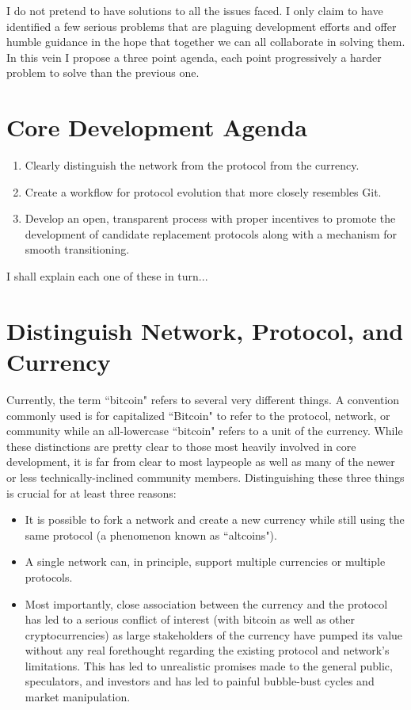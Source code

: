 \documentclass{article}
\begin{document}
I do not pretend to have solutions to all the issues faced. I only claim to have identified a few serious problems that are plaguing development efforts and offer humble guidance in the hope that together we can all collaborate in solving them. In this vein I propose a three point agenda, each point progressively a harder problem to solve than the previous one. 

\pagebreak

\section*{Core Development Agenda}

\begin{enumerate}
	\item Clearly distinguish the network from the protocol from the currency.
	\item Create a workflow for protocol evolution that more closely resembles Git.
	\item Develop an open, transparent process with proper incentives to promote the development of candidate replacement protocols along with a mechanism for smooth transitioning.
\end{enumerate}

I shall explain each one of these in turn...

\pagebreak

\section{Distinguish Network, Protocol, and Currency}

Currently, the term ``bitcoin" refers to several very different things. A convention commonly used is for capitalized ``Bitcoin" to refer to the protocol, network, or community while an all-lowercase ``bitcoin" refers to a unit of the currency. While these distinctions are pretty clear to those most heavily involved in core development, it is far from clear to most laypeople as well as many of the newer or less technically-inclined community members. Distinguishing these three things is crucial for at least three reasons:

\begin{itemize}
	\item It is possible to fork a network and create a new currency while still using the same protocol (a phenomenon known as ``altcoins").
	\item A single network can, in principle, support multiple currencies or multiple protocols.
	\item Most importantly, close association between the currency and the protocol has led to a serious conflict of interest (with bitcoin as well as other cryptocurrencies) as large stakeholders of the currency have pumped its value without any real forethought regarding the existing protocol and network's limitations. This has led to unrealistic promises made to the general public, speculators, and investors and has led to painful bubble-bust cycles and market manipulation.
\end{itemize}
\end{document}
